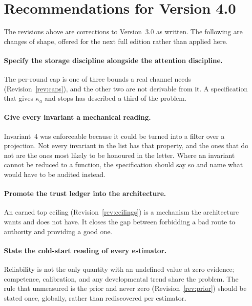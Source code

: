 \documentclass[11pt]{article}
\begin{document}
\section{Recommendations for Version 4.0}
\label{sec:recommendations}

The revisions above are corrections to Version~3.0 as written. The following are changes of shape, offered for the next full edition rather than applied here.

\paragraph{Specify the storage discipline alongside the attention discipline.} The per-round cap is one of three bounds a real channel needs (Revision~\ref{rev:caps}), and the other two are not derivable from it. A specification that gives $\kappa_a$ and stops has described a third of the problem.

\paragraph{Give every invariant a mechanical reading.} Invariant~4 was enforceable because it could be turned into a filter over a projection. Not every invariant in the list has that property, and the ones that do not are the ones most likely to be honoured in the letter. Where an invariant cannot be reduced to a function, the specification should say so and name what would have to be audited instead.

\paragraph{Promote the trust ledger into the architecture.} An earned top ceiling (Revision~\ref{rev:ceilings}) is a mechanism the architecture wants and does not have. It closes the gap between forbidding a bad route to authority and providing a good one.

\paragraph{State the cold-start reading of every estimator.} Reliability is not the only quantity with an undefined value at zero evidence; competence, calibration, and any developmental trend share the problem. The rule that unmeasured is the prior and never zero (Revision~\ref{rev:prior}) should be stated once, globally, rather than rediscovered per estimator.
\end{document}
